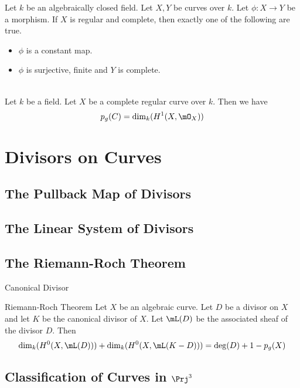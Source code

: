 \documentclass[a4paper]{article}
\begin{document}
\begin{prp}{}{} Let $k$ be an algebraically closed field. Let $X,Y$ be curves over $k$. Let $\phi:X\to Y$ be a morphism. If $X$ is regular and complete, then exactly one of the following are true. 
\begin{itemize}
\item $\phi$ is a constant map. 
\item $\phi$ is surjective, finite and $Y$ is complete. 
\end{itemize}
\end{prp}

\begin{prp}{}{}\\
Let $k$ be a field. Let $X$ be a complete regular curve over $k$. Then we have $$p_g(C)=\dim_k(H^1(X,\mO_X))$$
\end{prp}

\pagebreak
\section{Divisors on Curves}
\subsection{The Pullback Map of Divisors}

\subsection{The Linear System of Divisors}

\subsection{The Riemann-Roch Theorem}
\begin{defn}{Canonical Divisor}{}
\end{defn}

\begin{thm}{Riemann-Roch Theorem}{} Let $X$ be an algebraic curve. Let $D$ be a divisor on $X$ and let $K$ be the canonical divisor of $X$. Let $\mL(D)$ be the associated sheaf of the divisor $D$. Then $$\dim_k(H^0(X,\mL(D)))+\dim_k(H^0(X,\mL(K-D)))=\deg(D)+1-p_g(X)$$
\end{thm}

\subsection{Classification of Curves in $\Prj^3$}
\end{document}
